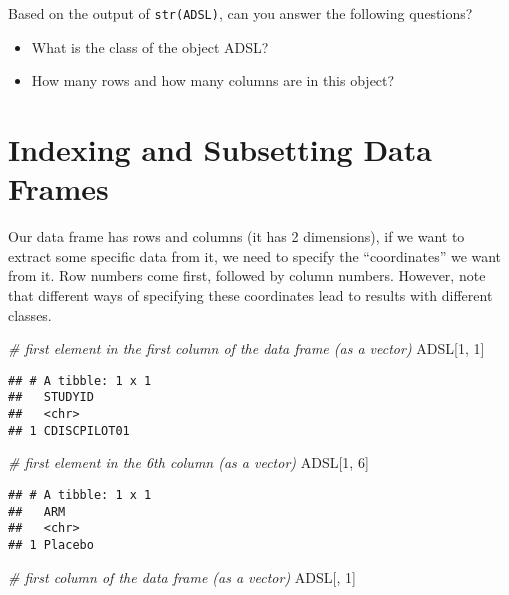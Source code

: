 \documentclass[]{book}
\newenvironment{Shaded}{\begin{snugshade}}{\end{snugshade}}
\newcommand{\CommentTok}[1]{\textcolor[rgb]{0.56,0.35,0.01}{\textit{#1}}}
\newcommand{\DecValTok}[1]{\textcolor[rgb]{0.00,0.00,0.81}{#1}}
\newcommand{\NormalTok}[1]{#1}
\providecommand{\tightlist}{%
  \setlength{\itemsep}{0pt}\setlength{\parskip}{0pt}}
\begin{document}
Based on the output of \texttt{str(ADSL)}, can you answer the following questions?

\begin{itemize}
\tightlist
\item
  What is the class of the object ADSL?
\item
  How many rows and how many columns are in this object?
\end{itemize}

\hypertarget{indexing-and-subsetting-data-frames}{%
\section{Indexing and Subsetting Data Frames}\label{indexing-and-subsetting-data-frames}}

Our data frame has rows and columns (it has 2 dimensions), if we want to extract some specific data from it, we need to specify the ``coordinates'' we want from it. Row numbers come first, followed by column numbers. However, note that different ways of specifying these coordinates lead to results with different classes.

\begin{Shaded}
\begin{Highlighting}[]
\CommentTok{# first element in the first column of the data frame (as a vector)}
\NormalTok{ADSL[}\DecValTok{1}\NormalTok{, }\DecValTok{1}\NormalTok{]   }
\end{Highlighting}
\end{Shaded}

\begin{verbatim}
## # A tibble: 1 x 1
##   STUDYID     
##   <chr>       
## 1 CDISCPILOT01
\end{verbatim}

\begin{Shaded}
\begin{Highlighting}[]
\CommentTok{# first element in the 6th column (as a vector)}
\NormalTok{ADSL[}\DecValTok{1}\NormalTok{, }\DecValTok{6}\NormalTok{]   }
\end{Highlighting}
\end{Shaded}

\begin{verbatim}
## # A tibble: 1 x 1
##   ARM    
##   <chr>  
## 1 Placebo
\end{verbatim}

\begin{Shaded}
\begin{Highlighting}[]
\CommentTok{# first column of the data frame (as a vector)}
\NormalTok{ADSL[, }\DecValTok{1}\NormalTok{] }
\end{Highlighting}
\end{Shaded}
\end{document}
